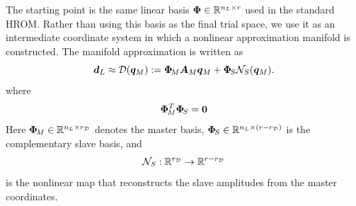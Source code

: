 \documentclass[11pt,a4paper]{article}
\begin{document}
The starting point is the same linear basis $\bm{\Phi}\in\mathbb{R}^{n_L\times r}$ used in the standard
HROM. Rather than using this basis as
the final trial space, we use it as an intermediate coordinate system in which
a nonlinear approximation manifold is constructed. The manifold approximation
is written as
\begin{equation}
\label{eq:decoder_master_slave}
    \bm{d}_L
    \approx
    \mathcal{\boldsymbol{D}}(\bm{q}_M)
    :=
    \bm{\Phi}_{\!M} \bm{A}_{M} \bm{q}_M
    +
    \bm{\Phi}_{\!S} \mathcal{N}_{S}(\bm{q}_M).
\end{equation}
where
\begin{equation}
\label{eq:isorth}
 \bm{\Phi}_{\!M}^T\bm{\Phi}_{\!S}=\bm{0}
\end{equation}
Here $\bm{\Phi}_{\!M}\in\mathbb{R}^{n_L\times r_{\mathcal{D}}}$ denotes the master basis,
$\bm{\Phi}_{\!S}\in\mathbb{R}^{n_L\times(r-r_{\mathcal{D}})}$ is the complementary slave basis,
and
\[
    \mathcal{N}_{S}:\mathbb{R}^{r_{\mathcal{D}}}
    \rightarrow
    \mathbb{R}^{r-r_{\mathcal{D}}}
\]
is the nonlinear map that reconstructs the slave amplitudes from the master
coordinates.
%
%
%
%
%
\end{document}
